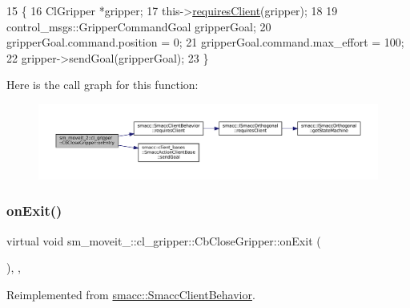 \begin{DoxyCode}
15     \{
16         ClGripper *gripper;
17         this->\hyperlink{classsmacc_1_1SmaccClientBehavior_a917f001e763a1059af337bf4e164f542}{requiresClient}(gripper);
18 
19         control\_msgs::GripperCommandGoal gripperGoal;
20         gripperGoal.command.position = 0;
21         gripperGoal.command.max\_effort = 100;
22         gripper->sendGoal(gripperGoal);
23     \}
\end{DoxyCode}
Here is the call graph for this function\+:
\nopagebreak
\begin{figure}[H]
\begin{center}
\leavevmode
\includegraphics[width=350pt]{classsm__moveit__2_1_1cl__gripper_1_1CbCloseGripper_aa2b903fc41ba2aecdb00d5f1804cfb75_cgraph}
\end{center}
\end{figure}
\mbox{\label{classsm__moveit__2_1_1cl__gripper_1_1CbCloseGripper_a6dfd0cf0abefda948c23767508cd8d86}} 
\subsubsection{\texorpdfstring{on\+Exit()}{onExit()}}
{\footnotesize\ttfamily virtual void sm\+\_\+moveit\+\_\+::cl\+\_\+gripper\+::\+Cb\+Close\+Gripper\+::on\+Exit (\begin{DoxyParamCaption}{ }\end{DoxyParamCaption})\hspace{0.3cm}{\ttfamily [inline]}, {\ttfamily [override]}, {\ttfamily [virtual]}}



Reimplemented from \hyperlink{classsmacc_1_1SmaccClientBehavior_ac0cd72d42bd00425362a97c9803ecce5}{smacc\+::\+Smacc\+Client\+Behavior}.



